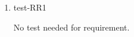 \documentclass[12pt, titlepage]{article}
\begin{document}
\begin{enumerate}







  \item{test-RR1\\}

  No test needed for requirement.

\end{enumerate}








  
\end{document}
